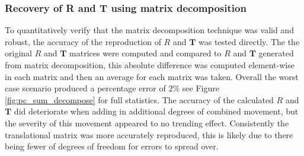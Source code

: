 \subsubsection{Recovery of R and T using matrix decomposition}

To quantitatively verify that the matrix decomposition technique was valid and robust, the accuracy of the reproduction of $R$ and $\mathbf{T}$ was tested directly.
The the original $R$ and $\mathbf{T}$ matrices were computed and compared to $R$ and $\mathbf{T}$ generated from matrix decomposition, this absolute difference was computed element-wise in each matrix and then an average for each matrix was taken.
Overall the worst case scenario produced a percentage error of $2\%$ see Figure \ref{fig:pc_sum_decompose} for full statistics.
The accuracy of the calculated $R$ and $\mathbf{T}$ did deteriorate when adding in additional degrees of combined movement, but the severity of this movement appeared to no trending effect.
Consistently the translational matrix was more accurately reproduced, this is likely due to there being fewer of degrees of freedom for errors to spread over.




